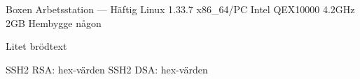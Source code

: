 \documentclass[a5paper]{article}
\begin{document}
   \computerdescription
       {Boxen}           %
       {Arbetsstation}   %
       {---}             %
       {Häftig Linux 1.33.7} %
       {x86\_64/PC}      %
       {Intel QEX10000 4.2GHz} %
       {2GB}             %
       {Hembygge}        %
       {någon}           %

    { Litet brödtext }

   \sshfingerprintheading
   \begin{sshfingerprint}
SSH2 RSA: hex-värden
SSH2 DSA: hex-värden
   \end{sshfingerprint}
\end{document}

